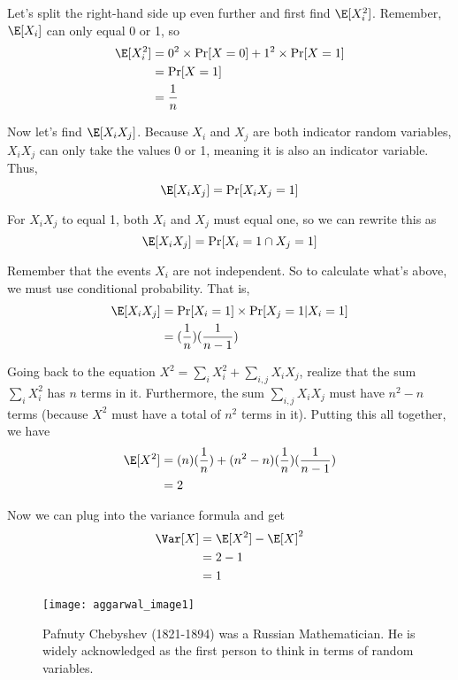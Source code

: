 Let’s split the right-hand side up even further and first find $\E[X_{i}^{2}]$. Remember, $\E[X_{i}]$ can only equal 0 or 1, so
    \begin{align*}
        \E[X_{i}^{2}] &= 0^{2} \times \Pr[X = 0] + 1^{2} \times \Pr[X = 1] \\
        &= \Pr[X = 1] \\
        &= \frac{1}{n}
    \end{align*}
    
Now let's find $\E[X_{i}X_{j}]$. Because $X_{i}$ and $X_{j}$ are both indicator random variables, $X_{i}X_{j}$ can only take the values 0 or 1, meaning it is also an indicator variable. Thus, 
    $$
    \E[X_{i}X_{j}] = \Pr[X_{i}X_{j} = 1]
    $$

For $X_{i}X_{j}$ to equal 1, both $X_{i}$ and $X_{j}$ must equal one, so we can rewrite this as
    $$
    \E[X_{i}X_{j}] = \Pr[X_{i} = 1 \cap X_{j} = 1]
    $$
    
Remember that the events $X_{i}$ are not independent. So to calculate what’s above, we must use conditional probability. That is,
    \begin{align*}
        \E[X_{i}X_{j}] &= \Pr[X_{i} = 1] \times \Pr[X_{j} = 1|X_{i} = 1] \\
        &= (\frac{1}{n})(\frac{1}{n-1})
    \end{align*}
    
\vspace{1.5mm}
    
Going back to the equation $X^{2} = \sum\limits_{i}X_{i}^{2} + \sum\limits_{i,j}X_{i}X_{j}$, realize that the sum $\sum\limits_{i}X_{i}^{2}$ has $n$ terms in it. Furthermore, the sum $\sum\limits_{i,j}X_{i}X_{j}$ must have $n^{2}-n$ terms (because $X^{2}$ must have a total of $n^{2}$ terms in it). Putting this all together, we have
    \begin{align*}
        \E[X^{2}] &= (n)(\frac{1}{n}) + (n^{2}-n)(\frac{1}{n})(\frac{1}{n-1}) \\
        &= 2
    \end{align*}
    
Now we can plug into the variance formula and get
\begin{align*}
    \Var[X] &= \E[X^{2}] - \E[X]^{2} \\
    &= 2 - 1 \\
    &= 1
\end{align*}

\vspace{1cm}

\renewcommand{\thefigure}{1}
\begin{figure}[htp]
    \centering
    \begin{minipage}{10.5cm}
    \texttt{[image: aggarwal\_image1]}
    \caption{Pafnuty Chebyshev (1821-1894) was a Russian Mathematician. He is widely acknowledged as the first person to think in terms of random variables. }
    \label{fig:1}
    \end{minipage}
\end{figure}
